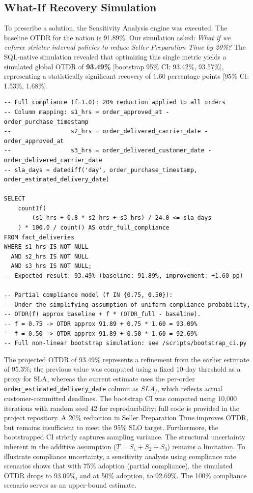 \documentclass[conference]{IEEEtran}
\begin{document}
\subsection{What-If Recovery Simulation}
To prescribe a solution, the Sensitivity Analysis engine was executed. The baseline OTDR for the nation is 91.89\%. Our simulation asked: \textit{What if we enforce stricter internal policies to reduce Seller Preparation Time by 20\%?} The SQL-native simulation revealed that optimizing this single metric yields a simulated global OTDR of \textbf{93.49\%} [bootstrap 95\% CI: 93.42\%, 93.57\%], representing a statistically significant recovery of 1.60 percentage points [95\% CI: 1.53\%, 1.68\%].

\begin{lstlisting}[caption={Compliance Scenario Simulation}, label={lst:compliance}]
-- Full compliance (f=1.0): 20% reduction applied to all orders
-- Column mapping: s1_hrs = order_approved_at - order_purchase_timestamp
--                 s2_hrs = order_delivered_carrier_date - order_approved_at
--                 s3_hrs = order_delivered_customer_date - order_delivered_carrier_date
-- sla_days = datediff('day', order_purchase_timestamp, order_estimated_delivery_date)

SELECT
    countIf(
        (s1_hrs + 0.8 * s2_hrs + s3_hrs) / 24.0 <= sla_days
    ) * 100.0 / count() AS otdr_full_compliance
FROM fact_deliveries
WHERE s1_hrs IS NOT NULL
  AND s2_hrs IS NOT NULL
  AND s3_hrs IS NOT NULL;
-- Expected result: 93.49% (baseline: 91.89%, improvement: +1.60 pp)

-- Partial compliance model (f IN {0.75, 0.50}):
-- Under the simplifying assumption of uniform compliance probability,
-- OTDR(f) approx baseline + f * (OTDR_full - baseline).
-- f = 0.75 -> OTDR approx 91.89 + 0.75 * 1.60 = 93.09%
-- f = 0.50 -> OTDR approx 91.89 + 0.50 * 1.60 = 92.69%
-- Full non-linear bootstrap simulation: see /scripts/bootstrap_ci.py
\end{lstlisting}

The projected OTDR of 93.49\% represents a refinement from the earlier estimate of 95.3\%; the previous value was computed using a fixed 10-day threshold as a proxy for SLA, whereas the current estimate uses the per-order \texttt{order\_estimated\_delivery\_date} column as $SLA_j$, which reflects actual customer-committed deadlines. The bootstrap CI was computed using 10,000 iterations with random seed 42 for reproducibility; full code is provided in the project repository. A 20\% reduction in Seller Preparation Time improves OTDR, but remains insufficient to meet the 95\% SLO target. Furthermore, the bootstrapped CI strictly captures sampling variance. The structural uncertainty inherent in the additive assumption ($T = S_1 + S_2 + S_3$) remains a limitation. To illustrate compliance uncertainty, a sensitivity analysis using compliance rate scenarios shows that with 75\% adoption (partial compliance), the simulated OTDR drops to 93.09\%, and at 50\% adoption, to 92.69\%. The 100\% compliance scenario serves as an upper-bound estimate.
\end{document}
